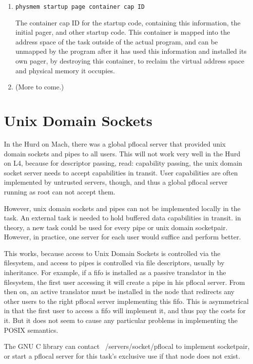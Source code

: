 \begin{enumerate}
\item \texttt{physmem startup page container cap ID}
  
  The container cap ID for the startup code, containing this
  information, the initial pager, and other startup code.  This
  container is mapped into the address space of the task outside of
  the actual program, and can be unmapped by the program after it has
  used this information and installed its own pager, by destroying
  this container, to reclaim the virtual address space and physical
  memory it occupies.

\item (More to come.)
\end{enumerate}


\section{Unix Domain Sockets}
\label{unixdomainsockets}

In the Hurd on Mach, there was a global pflocal server that provided
unix domain sockets and pipes to all users.  This will not work very
well in the Hurd on L4, because for descriptor passing, read:
capability passing, the unix domain socket server needs to accept
capabilities in transit.  User capabilities are often implemented by
untrusted servers, though, and thus a global pflocal server running as
root can not accept them.

However, unix domain sockets and pipes can not be implemented locally
in the task.  An external task is needed to hold buffered data
capabilities in transit.  in theory, a new task could be used for
every pipe or unix domain socketpair.  However, in practice, one
server for each user would suffice and perform better.

This works, because access to Unix Domain Sockets is controlled via
the filesystem, and access to pipes is controlled via file
descriptors, usually by inheritance.  For example, if a fifo is
installed as a passive translator in the filesystem, the first user
accessing it will create a pipe in his pflocal server.  From then on,
an active translator must be installed in the node that redirects any
other users to the right pflocal server implementing this fifo.  This
is asymmetrical in that the first user to access a fifo will implement
it, and thus pay the costs for it.  But it does not seem to cause any
particular problems in implementing the POSIX semantics.

The GNU C library can contact ~/servers/socket/pflocal to implement
socketpair, or start a pflocal server for this task's exclusive use if
that node does not exist.

